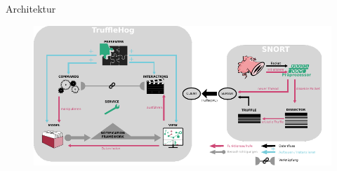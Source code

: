 \begin{frame}{Architektur}
    \begin{figure}
    	\centering
    	\includegraphics[width=\textwidth]{./images/arch/18.pdf}
    \end{figure}
\end{frame}
